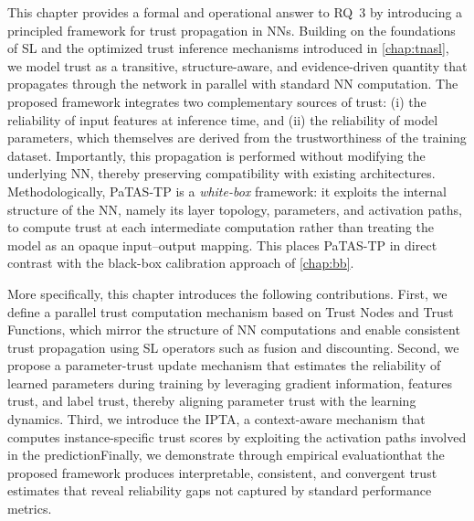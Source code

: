 This chapter provides a formal and operational answer to \ac{RQ}~3 by introducing a principled framework for trust propagation in \acp{NN}. Building on the foundations of \ac{SL} and the optimized trust inference mechanisms introduced in \cref{chap:tnasl}, we model trust as a transitive, structure-aware, and evidence-driven quantity that propagates through the network in parallel with standard \ac{NN} computation. The proposed framework integrates two complementary sources of trust: (i) the reliability of input features at inference time, and (ii) the reliability of model parameters, which themselves are derived from the trustworthiness of the training dataset. Importantly, this propagation is performed without modifying the underlying \ac{NN}, thereby preserving compatibility with existing architectures. Methodologically, \ac{PaTAS-TP} is a \emph{white-box} framework: it exploits the internal structure of the \ac{NN}, namely its layer topology, parameters, and activation paths, to compute trust at each intermediate computation rather than treating the model as an opaque input--output mapping. This places \ac{PaTAS-TP} in direct contrast with the black-box calibration approach of \cref{chap:bb}.

More specifically, this chapter introduces the following contributions. First, we define a parallel trust computation mechanism based on Trust Nodes and Trust Functions, which mirror the structure of \ac{NN} computations and enable consistent trust propagation using \ac{SL} operators such as fusion and discounting. Second, we propose a parameter-trust update mechanism that estimates the reliability of learned parameters during training by leveraging gradient information, features trust, and label trust, thereby aligning parameter trust with the learning dynamics\DIFaddbegin {}\DIFaddend . Third, we introduce the \ac{IPTA}, a context-aware mechanism that computes instance-specific trust scores by exploiting the activation paths involved in the prediction\DIFdelbegin {}\DIFdelend \DIFaddbegin {}\DIFaddend Finally, we demonstrate through empirical evaluation\DIFaddbegin {}\DIFaddend that the proposed framework produces interpretable, consistent, and convergent trust estimates that reveal reliability gaps not captured by standard performance metrics.

